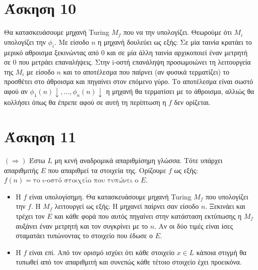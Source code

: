 \documentclass[11pt]{article}
\begin{document}



\section*{Άσκηση 10}
Θα κατασκευάσουμε μηχανή Turing $M_f$ που να την υπολογίζει. Θεωρούμε ότι $M_i$ υπολογίζει την $\phi_i$.
Με είσοδο $n$ η μηχανή δουλεύει ως εξής: Σε μία ταινία κρατάει το μερικό αθροισμα ξεκινώντας από 0 και σε μία
άλλη ταινία αρχικοποιεί έναν μετρητή σε 0 που μετράει επαναλήψεις. Στην i-οστή επανάληψη προσωμοιώνει τη λειτουργεία
της $M_i$ με είσοδο $n$ και το αποτέλεσμα που παίρνει (αν φυσικά τερματίζει) το προσθέτει στο άθροισμα και πηγαίνει στον
επόμενο γύρο. Το αποτέλεσμα είναι σωστό αφού αν $\phi_1(n)\downarrow,\ldots,\phi_n(n)\downarrow$ η μηχανή θα τερματίσει
με το άθροισμα, αλλιώς θα κολλήσει όπως θα έπρεπε αφού σε αυτή τη περίπτωση η $f$ δεν ορίζεται.





\section*{Άσκηση 11}
$(\Rightarrow)$ Έστω $L$ μη κενή αναδρομικά απαριθμίσημη γλώσσα. Τότε υπάρχει απαριθμιτής $E$ 
που απαριθμεί τα στοιχεία της. Ορίζουμε $f$ ως εξής: $f(n) = \text{το ι-οστό στοιχείο που τυπώνει ο }E$. 
\begin{itemize}
  \item Η $f$ είναι υπολογίσημη. Θα κατασκευάσουμε μηχανή Turing $M_f$ που υπολογίζει την $f$. Η $M_f$ 
    λειτουργεί ως εξής: Η μηχανεί παίρνει σαν είσοδο $n$. Ξεκινάει και τρέχει τον $E$ και κάθε φορά 
    που αυτός πηγαίνει στην κατάσταση εκτύπωσης η $M_f$ αυξάνει έναν μετρητή και τον συγκρίνει με το $n$.
    Αν οι δύο τιμές είναι ίσες σταματάει τυπώνοντας το στοιχείο που έδωσε ο $E$. 
  \item Η $f$ είναι επί. Από τον ορισμό ισχύει ότι κάθε στοιχείο $x\in L$ κάποια στιγμή θα τυπωθεί
    από τον απαριθμιτή και συνεπώς κάθε τέτοιο στοιχείο έχει προεικόνα.
\end{itemize}
\end{document}
